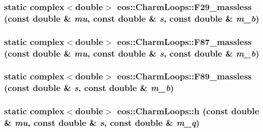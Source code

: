 \label{structeos_1_1CharmLoops_ac670d235f7b371739d54e2c731dac27b}
\hypertarget{structeos_1_1CharmLoops_a127312f7cefb95c9e4d19fe90aaadb9a}{
\subsubsection[{F29\_\-massless}]{\setlength{\rightskip}{0pt plus 5cm}static complex$<$double$>$ eos::CharmLoops::F29\_\-massless (const double \& {\em mu}, \/  const double \& {\em s}, \/  const double \& {\em m\_\-b})}}
\label{structeos_1_1CharmLoops_a127312f7cefb95c9e4d19fe90aaadb9a}
\hypertarget{structeos_1_1CharmLoops_a81ea6bfba7981c218c0c94ed79688266}{
\subsubsection[{F87\_\-massless}]{\setlength{\rightskip}{0pt plus 5cm}static complex$<$double$>$ eos::CharmLoops::F87\_\-massless (const double \& {\em mu}, \/  const double \& {\em s}, \/  const double \& {\em m\_\-b})}}
\label{structeos_1_1CharmLoops_a81ea6bfba7981c218c0c94ed79688266}
\hypertarget{structeos_1_1CharmLoops_a02dd5d2de6eb110c9dc4abe8db9329b0}{
\subsubsection[{F89\_\-massless}]{\setlength{\rightskip}{0pt plus 5cm}static complex$<$double$>$ eos::CharmLoops::F89\_\-massless (const double \& {\em s}, \/  const double \& {\em m\_\-b})}}
\label{structeos_1_1CharmLoops_a02dd5d2de6eb110c9dc4abe8db9329b0}
\hypertarget{structeos_1_1CharmLoops_a8255879e6ac2840a7bfc652aceac5221}{
\subsubsection[{h}]{\setlength{\rightskip}{0pt plus 5cm}static complex$<$double$>$ eos::CharmLoops::h (const double \& {\em mu}, \/  const double \& {\em s}, \/  const double \& {\em m\_\-q})}}

